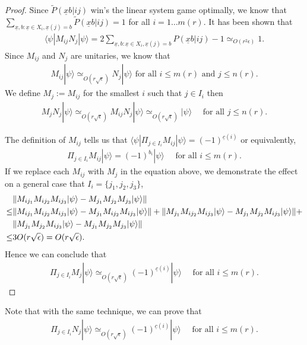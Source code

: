 \documentclass[11pt,letterpaper]{article}
\newcommand{\ket}[1]{|#1\rangle}
\newcommand{\bra}[1]{\langle#1|}
\DeclarePairedDelimiter{\norm}{\lVert}{\rVert}
\newcommand{\1}{\mathbb{1}}
\newcommand{\nr}{n(r)}
\newcommand{\mr}{m(r)}
\newcommand{\ux}{\underline{x}}
\newcommand{\uc}{\underline{c}}
\newcommand{\pr}[2]{P(#1|#2)}
\newcommand{\tpr}[2]{\tilde{P}(#1|#2)}
\newcommand{\ep}{\epsilon}
\newcommand{\se}{\sqrt{\epsilon}}
\newcommand{\appd}[1]{\simeq_{#1}}
\theoremstyle{definition}
\begin{document}
\begin{proof}
Since $\tpr{\ux b}{ij}$ win's the linear system game optimally, we know that 
$
\sum_{\ux,b: \ux \in X_i, \ux(j) = b} \tpr{\ux b}{ij} = 1
$
for all $i = 1 \dots \mr$.
It has been shown \cite{slofstra2017} that 
\begin{align}
	\bra{\psi} M_{ij} N_j \ket{\psi} = 2 \sum_{\ux,b: \ux \in X_i, \ux(j) = b} \pr{\ux b}{ij} -1 \appd{O(r^2 \ep)} 1.
\end{align}
Since $M_{ij}$ and $N_j$ are unitaries, we know that
\begin{align}
	M_{ij} \ket{\psi} \appd{O(r\se)} N_j \ket{\psi} \text{ for all } i \leq \mr \text{ and } j \leq \nr.
\end{align}
We define $M_j := M_{ij}$ for the smallest $i$ such that $ j \in I_i$ then 
\begin{align}
	M_j N_j \ket{\psi} \appd{O(r\se)} M_{ij}N_j\ket{\psi} \appd{O(r\se)} \ket{\psi} \quad \text{ for all } j \leq \nr.
\end{align}

The definition of $M_{ij}$ tells us that 
$
\bra{\psi} \Pi_{j \in I_i} M_{ij} \ket{\psi} = (-1)^{\uc(i)}
$
or equivalently,
\begin{align}
	\Pi_{j \in I_i} M_{ij} \ket{\psi} = (-1)^{b_i} \ket{\psi}\quad\text{ for all } i \leq \mr.
\end{align}	
If we replace each $M_{ij}$ with $M_j$ in the equation above, we demonstrate the effect on a
general case that $I_i = \{j_1, j_2, j_3\}$,
\begin{align*}
	&\norm{ M_{ij_1}M_{ij_2}M_{ij_3} \ket{\psi} - M_{j_1}M_{j_2}M_{j_3} \ket{\psi}}\\
	\leq & \norm{M_{ij_1}M_{ij_2}M_{ij_3} \ket{\psi} - M_{j_1}M_{ij_2}M_{ij_3} \ket{\psi}}+
	\norm{M_{j_1}M_{ij_2}M_{ij_3} \ket{\psi} - M_{j_1}M_{j_2}M_{ij_3} \ket{\psi}} +\\
	&\norm{M_{j_1}M_{j_2}M_{ij_3} \ket{\psi} - M_{j_1}M_{j_2}M_{j_3} \ket{\psi}}\\
	\leq &3O(r\se) = O(r\se).
\end{align*}
Hence we can conclude that 
\begin{align}
	\Pi_{j \in I_i} M_j \ket{\psi} \appd{O(r\se)} (-1)^{\uc(i)}\ket{\psi} \quad \text{ for all } i \leq \mr.
\end{align}
\end{proof}
Note that with the same technique, we can prove that 
\begin{align}
	\Pi_{j \in I_i} N_j \ket{\psi} \appd{O(r\se)} (-1)^{\uc(i)}\ket{\psi} \quad \text{ for all } i \leq \mr.
\end{align}
\end{document}
